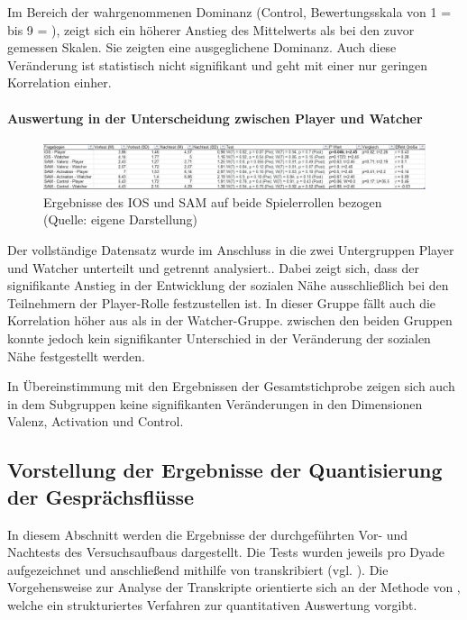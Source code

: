 Im Bereich der wahrgenommenen Dominanz (Control, Bewertungsskala von 1 =  bis 9 = ), zeigt sich ein höherer Anstieg des Mittelwerts als bei den zuvor gemessen Skalen. Sie zeigten eine ausgeglichene Dominanz. Auch diese Veränderung ist statistisch nicht signifikant und geht mit einer nur geringen Korrelation einher.

\paragraph{Auswertung in der Unterscheidung zwischen Player und Watcher}

\begin{figure}[ht]
\centering
\includegraphics[width=1\linewidth]{content/pictures/IOS_SAM_Player_Watcher.png}
\caption{Ergebnisse des \ac{IOS} und \ac{SAM} auf beide Spielerrollen bezogen (Quelle: eigene Darstellung)}
\label{fig:ios_sam_roles}
\end{figure}

Der vollständige Datensatz wurde im Anschluss in die zwei Untergruppen Player und Watcher unterteilt und getrennt analysiert.. Dabei zeigt sich, dass der signifikante Anstieg in der Entwicklung der sozialen Nähe ausschließlich bei den Teilnehmern der Player-Rolle festzustellen ist. In dieser Gruppe fällt auch die Korrelation höher aus als in der Watcher-Gruppe. zwischen den beiden Gruppen konnte jedoch kein signifikanter Unterschied in der Veränderung der sozialen Nähe festgestellt werden.

In Übereinstimmung mit den Ergebnissen der Gesamtstichprobe zeigen sich auch in dem Subgruppen keine signifikanten Veränderungen in den Dimensionen Valenz, Activation und Control.

\subsection{Vorstellung der Ergebnisse der Quantisierung der Gesprächsflüsse}

In diesem Abschnitt werden die Ergebnisse der durchgeführten Vor- und Nachtests des Versuchsaufbaus dargestellt. Die Tests wurden jeweils pro Dyade aufgezeichnet und anschließend mithilfe von  transkribiert (vgl. \citealp{bain_whisperx_2023}). Die Vorgehensweise zur Analyse der Transkripte orientierte sich an der Methode von \cite{nasir_effect_2015}, welche ein strukturiertes Verfahren zur quantitativen Auswertung vorgibt.


